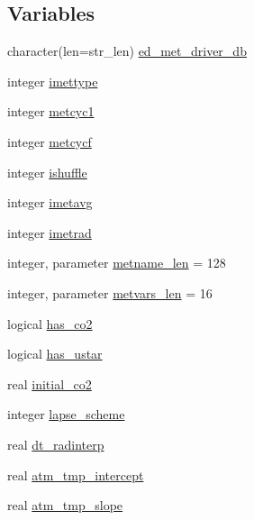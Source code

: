 \subsection*{Variables}
\begin{DoxyCompactItemize}
\item 
character(len=str\+\_\+len) \hyperlink{namespacemet__driver__coms_a6d4b4339194ba7e2d390472721730670}{ed\+\_\+met\+\_\+driver\+\_\+db}
\item 
integer \hyperlink{namespacemet__driver__coms_af5accdb5c0675336f8ddabee3bace10d}{imettype}
\item 
integer \hyperlink{namespacemet__driver__coms_a1bdb4a13bac006468d76ccc158d7d3e1}{metcyc1}
\item 
integer \hyperlink{namespacemet__driver__coms_a9a06bc94d2fbf01d6d9ef295ba9f3887}{metcycf}
\item 
integer \hyperlink{namespacemet__driver__coms_a2ce26de7e6f46dc8cd0da3bfe754ee30}{ishuffle}
\item 
integer \hyperlink{namespacemet__driver__coms_a0660a4efaebadf28bdab54bf9951a37a}{imetavg}
\item 
integer \hyperlink{namespacemet__driver__coms_ab7529fe9e7b6343182886ee340c1e7a2}{imetrad}
\item 
integer, parameter \hyperlink{namespacemet__driver__coms_a8dc2e2ece34bf7b8bd355e602f477c66}{metname\+\_\+len} = 128
\item 
integer, parameter \hyperlink{namespacemet__driver__coms_af6adda2378b0db677d6ea2016d8cf4b3}{metvars\+\_\+len} = 16
\item 
logical \hyperlink{namespacemet__driver__coms_a2e3ba81bddf15bc81564998b3b1ca34d}{has\+\_\+co2}
\item 
logical \hyperlink{namespacemet__driver__coms_adda4be70af136683fcaaf3a8db47aff6}{has\+\_\+ustar}
\item 
real \hyperlink{namespacemet__driver__coms_a7c852a1288bd8e6ada039b1272bb2dee}{initial\+\_\+co2}
\item 
integer \hyperlink{namespacemet__driver__coms_ae37a372059ee47809fc1211fac945fd9}{lapse\+\_\+scheme}
\item 
real \hyperlink{namespacemet__driver__coms_a7fbebdfb60d0f28a7a8bb5985b016015}{dt\+\_\+radinterp}
\item 
real \hyperlink{namespacemet__driver__coms_a2de0be53549400d64a282d3855baab65}{atm\+\_\+tmp\+\_\+intercept}
\item 
real \hyperlink{namespacemet__driver__coms_ab3817d72cc9b0c3aa3448963c86030a0}{atm\+\_\+tmp\+\_\+slope}

\end{DoxyCompactItemize}
